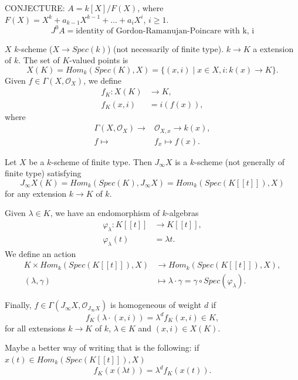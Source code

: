 \documentclass[a4paper, 12pt, reqno]{amsart}
\theoremstyle{remark}
\begin{document}
CONJECTURE: $A = k[X]/F(X)$, where $F(X) = X^k + a_{k - 1}X^{k - 1} + \dots + a_iX^i$, $i \ge 1$.
\begin{equation*}
  J^0A = \text{identity of Gordon-Ramanujan-Poincare with k, i} 
\end{equation*}

$X$ $k$-scheme ($X \to Spec(k)$) (not necessarily of finite type).
$k \to K$ a extension of $k$.
The set of $K$-valued points is
\begin{equation*}
  X(K) = Hom_k(Spec(K), X) = \{(x, i) \mid x \in X, i: k(x) \to K\}.
\end{equation*}
Given $f \in \Gamma(X, \mathcal{O}_X)$, we define
\begin{align*}
  f_K: X(K) &\to K, \\
  f_K(x, i) &= i(f(x)),
\end{align*}
where
\begin{align*}
  \Gamma(X, \mathcal{O}_X) \to &\mathcal{O}_{X, x} \to k(x), \\
  f \mapsto &f_x \mapsto f(x).
\end{align*}

Let $X$ be a $k$-scheme of finite type.
Then $J_{\infty}X$ is a $k$-scheme (not generally of finite type) satisfying
\begin{equation*}
  J_{\infty}X(K) = Hom_k(Spec(K), J_{\infty}X) = Hom_k(Spec(K[[t]]), X)
\end{equation*}
for any extension $k \to K$ of $k$.

Given $\lambda \in K$, we have an endomorphism of $k$-algebras
\begin{align*}
  \varphi_{\lambda}: K[[t]] &\to K[[t]], \\
  \varphi_{\lambda}(t) &= \lambda t.
\end{align*}
We define an action
\begin{align*}
  K \times Hom_k(Spec(K[[t]]), X) &\to Hom_k(Spec(K[[t]]), X), \\
  (\lambda, \gamma) &\mapsto \lambda\cdot\gamma = \gamma \circ Spec(\varphi_{\lambda}).
\end{align*}

Finally, $f \in \Gamma(J_{\infty}X, \mathcal{O}_{J_{\infty}X})$ is homogeneous of weight $d$ if
\begin{equation*}
  f_K(\lambda\cdot(x, i)) = \lambda^df_K(x, i) \in K,
\end{equation*}
for all extensions $k \to K$ of $k$, $\lambda \in K$ and $(x, i) \in X(K)$.

Maybe a better way of writing that is the following: if $x(t) \in Hom_k(Spec(K[[t]]), X)$
\begin{equation*}
  f_K(x(\lambda t)) = \lambda^df_K(x(t)).
\end{equation*}
\end{document}
